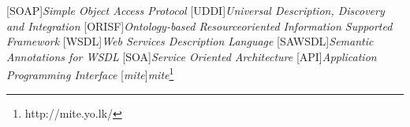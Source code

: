 
[SOAP]{\emph{Simple Object Access Protocol}}
[UDDI]{\emph{Universal Description, Discovery and Integration}}
[ORISF]{\emph{Ontology-based Resourceoriented Information Supported Framework}}
[WSDL]{\emph{Web Services Description Language}}
[SAWSDL]{\emph{Semantic Annotations for WSDL}}
[SOA]{\emph{Service Oriented Architecture}}
[API]{\emph{Application Programming Interface}}
[\emph{mite}]{\emph{mite}\footnote{http://mite.yo.lk/}}